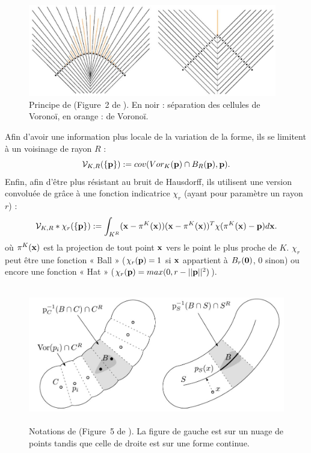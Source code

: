 \begin{figure}[ht]{
    \begin{center}
    \includegraphics[height=4cm]{images/Feature/VCM}
    \end{center}}
    \caption[Principe de \VCM.]{Principe de \VCM (Figure~2 de \cite{Merigot2011}). En noir : séparation des cellules de Voronoï, en orange :  de Voronoï.
      \label{fig:mellado-VCM}}
\end{figure}

Afin d'avoir une information plus locale de la variation de la forme, ils se
limitent à un voisinage de rayon $R$ :
%
\begin{equation}
  \mathcal{V}_{K,R}(\{\mathbf{p}\}) := cov(Vor_K(\mathbf{p}) \cap B_{R}(\mathbf{p}), \mathbf{p}) .
\end{equation}
%
Enfin, afin d'être plus résistant au bruit de Hausdorff, ils utilisent une
version convoluée de \VCM grâce à une fonction indicatrice $\chi_r$
(ayant pour paramètre un rayon $r$) :
%
\begin{equation}
  \mathcal{V}_{K,R} \ast \chi_r(\{\mathbf{p}\}) := \int_{K^R} (\mathbf{x} - \pi^K(\mathbf{x}))(\mathbf{x} - \pi^K(\mathbf{x}))^T \chi(\pi^K(\mathbf{x}) - \mathbf{p}) d\mathbf{x} .
\end{equation}
%
où $\pi^K(\mathbf{x})$ est la projection de tout point $\mathbf{x}$ vers le point le plus proche de
$K$. $\chi_r$ peut être une fonction « Ball » ($\chi_r(\mathbf{p}) = 1$ si $\mathbf{x}$
appartient à $B_{r}(\mathbf{0})$, $0$ sinon) ou encore une fonction « Hat »
($\chi_r(\mathbf{p}) = max(0, r - ||\mathbf{p}||^2)$).

\begin{figure}[ht]{
    \begin{center}
    \includegraphics[height=6cm]{images/Feature/VCM_notations}
    \end{center}}
    \caption[Notations de \VCM.]{Notations de \VCM (Figure~5 de \cite{Merigot2011}). La figure de gauche est sur un nuage de points tandis que celle de droite est sur une forme continue. \label{fig:mellado-multiscale}}
\end{figure}


